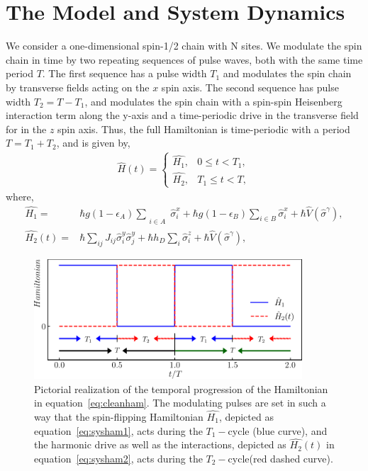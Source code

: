 \documentclass[12pt]{iopart}
\begin{document}
\section{\label{sec:mdl_n_dynam} The Model and System Dynamics}
We consider a one-dimensional spin-1/2 chain with N sites.  We modulate the spin chain in time by two repeating sequences of pulse waves, both with the same time period $T$.  The first sequence has a pulse width $T_1$ and modulates the spin chain by transverse fields acting on the $x$ spin axis. The second sequence has pulse width $T_2=T-T_1$, and modulates the spin chain with a spin-spin Heisenberg interaction term along the y-axis and a time-periodic drive in the transverse field for in the $z$ spin axis. Thus, the full Hamiltonian is time-periodic with a period $T=T_1+T_2$, and is given by,
\begin{align}
    \hat{H}(t) = 
    \begin{cases}
        \hat{H_1} , & 0\leq t < T_1,\\
        \hat{H_2} , & T_1\leq t < T,
    \end{cases}
    \label{eq:cleanham}
\end{align}
where,
\begin{align}
    \hat{H_1} = & \hbar g (1-\epsilon_A) \sum_{\substack{\\i \in A}}\hat{\sigma}^x_i + \hbar g (1-\epsilon_B) \sum_{i \in B}\hat{\sigma}^x_i+ \hbar\hat{V}(\hat{\sigma}^{\gamma}),\label{eq:sysham1}\\
    \hat{H_2}(t) = & \hbar\sum_{ij} J_{ij} \hat{\sigma}^y_i \hat{\sigma}^y_{j} +  \hbar h_D \sum_i \hat{\sigma}^z_i + \hbar\hat{V}(\hat{\sigma}^{\gamma}),
    \label{eq:sysham2}
\end{align}
\begin{figure}
    \begin{center}
        \includegraphics[width=10cm]{figure1.pdf}
    \end{center}
    \caption{Pictorial realization of the temporal progression of the Hamiltonian in equation~\eqref{eq:cleanham}. The modulating pulses are set in such a way that the spin-flipping Hamiltonian $\hat{H_1}$, depicted as equation~\eqref{eq:sysham1}, acts during the $T_1-$cycle (blue curve), and the harmonic drive as well as the interactions, depicted as $\hat{H_2}(t)$ in equation~\eqref{eq:sysham2}, acts during the $T_2-$cycle(red dashed curve).}
    \label{Fig:time_distribution}
\end{figure}	
\end{document}
